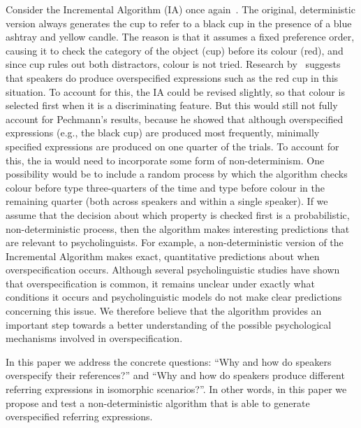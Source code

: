 Consider the Incremental Algorithm (IA) once again~\cite{dale95}. The original, deterministic version always generates the cup to refer to a black cup in the
presence of a blue ashtray and yellow candle. The reason is that it assumes a fixed preference order, causing it to check the category of the object (cup) before its colour (red), and since cup rules out both distractors, colour is not tried. Research by~\cite{pechmann89} suggests that speakers do produce overspecified expressions
such as the red cup in this situation. To account for this, the IA could be revised slightly, so that colour is selected first when it is a discriminating feature. But this would still not fully account for Pechmann's results, because he showed that although overspecified expressions (e.g., the black cup) are produced most frequently, minimally specified expressions are produced on one quarter of the trials. To account for this, the ia would need to incorporate some form of non-determinism. One possibility would be to include a random process by which the algorithm checks colour before type three-quarters of the time and type before colour in the remaining quarter (both across speakers and within a single speaker). If we assume that the decision about which property is checked first is a probabilistic, non-deterministic process, then the algorithm makes interesting predictions that are relevant to psycholinguists. For example, a non-deterministic version of the Incremental Algorithm makes exact, quantitative predictions about when overspecification occurs. Although several psycholinguistic studies have shown that overspecification is common, it remains unclear under exactly what conditions it occurs and psycholinguistic models do not make clear predictions concerning this issue. We therefore believe that the algorithm provides an important step towards a better understanding of the possible psychological mechanisms involved in overspecification.

In this paper we address the concrete questions: ``Why and how do speakers overspecify their references?'' and ``Why and how do speakers produce different referring expressions in isomorphic scenarios?''. In other words, in this paper we propose and test a non-deterministic algorithm that is able to generate overspecified referring expressions.  

